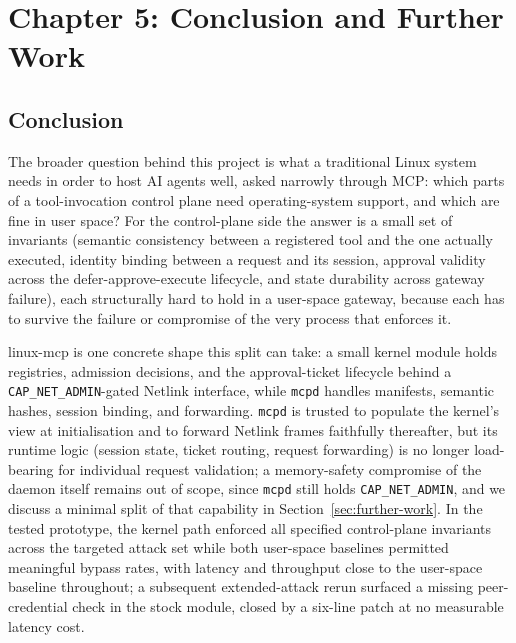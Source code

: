 \section*{Chapter 5: Conclusion and Further Work}
 \label{chap:conclusion} \setcounter{section}{5} \setcounter{subsection}{0}

\subsection{Conclusion}

The broader question behind this project is what a traditional Linux system needs in order to host AI agents well, asked narrowly through MCP: which parts of a tool-invocation control plane need operating-system support, and which are fine in user space?
For the control-plane side the answer is a small set of invariants (semantic consistency between a registered tool and the one actually executed, identity binding between a request and its session, approval validity across the defer-approve-execute lifecycle, and state durability across gateway failure), each structurally hard to hold in a user-space gateway, because each has to survive the failure or compromise of the very process that enforces it.

linux-mcp is one concrete shape this split can take: a small kernel module holds registries, admission decisions, and the approval-ticket lifecycle behind a \texttt{CAP\_\allowbreak NET\_\allowbreak ADMIN}-gated Netlink interface, while \texttt{mcpd} handles manifests, semantic hashes, session binding, and forwarding.
\texttt{mcpd} is trusted to populate the kernel's view at initialisation and to forward Netlink frames faithfully thereafter, but its runtime logic (session state, ticket routing, request forwarding) is no longer load-bearing for individual request validation; a memory-safety compromise of the daemon itself remains out of scope, since \texttt{mcpd} still holds \texttt{CAP\_\allowbreak NET\_\allowbreak ADMIN}, and we discuss a minimal split of that capability in Section~\ref{sec:further-work}.
In the tested prototype, the kernel path enforced all specified control-plane invariants across the targeted attack set while both user-space baselines permitted meaningful bypass rates, with latency and throughput close to the user-space baseline throughout; a subsequent extended-attack rerun surfaced a missing peer-credential check in the stock module, closed by a six-line patch at no measurable latency cost.

